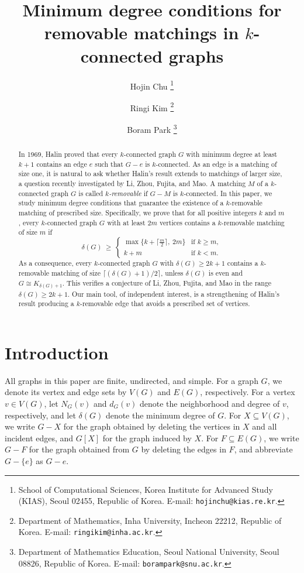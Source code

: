 \documentclass[11pt]{article}
\title{Minimum degree conditions for removable matchings in $k$-connected graphs}
\author{Hojin Chu
\thanks{School of Computational Sciences, Korea Institute for Advanced Study (KIAS), Seoul 02455, Republic of Korea. E-mail: {\tt hojinchu@kias.re.kr}.}
\and Ringi Kim
\thanks{Department of Mathematics, Inha University, Incheon 22212, Republic of Korea. E-mail: {\tt ringikim@inha.ac.kr}.}
\and Boram Park
\thanks{Department of Mathematics Education, Seoul National University, Seoul 08826, Republic of Korea. E-mail: {\tt borampark@snu.ac.kr}.}
}
\date{}
\numberwithin{equation}{section}
\begin{document}
\maketitle

\begin{abstract}
In 1969, Halin proved that every $k$-connected graph $G$ with minimum degree at least $k+1$ contains an edge $e$ such that $G-e$ is $k$-connected. As an edge is a matching of size one, it is natural to ask whether Halin's result extends to matchings of larger size, a question recently investigated by Li, Zhou, Fujita, and Mao. A matching $M$ of a $k$-connected graph $G$ is called \emph{$k$-removable} if $G-M$ is $k$-connected.  In this paper, we study minimum degree conditions that guarantee the existence of a $k$-removable matching of prescribed size. Specifically, we prove that for all positive integers $k$ and $m$, every $k$-connected graph $G$ with at least $2m$ vertices contains a $k$-removable matching of size $m$ if  \[\delta(G)\ \ge\ \begin{cases} \max\bigl\{k+\bigl\lceil\tfrac m2\bigr\rceil,\ 2m\bigr\} & \text{if } k\ge m,\\[2pt] k+m & \text{if } k<m. \end{cases}\] As a consequence, every $k$-connected graph $G$ with $\delta(G)\ge2k+1$ contains a $k$-removable matching of size $\bigl\lceil(\delta(G)+1)/2\bigr\rceil$, unless $\delta(G)$ is even and $G\cong K_{\delta(G)+1}$.  This verifies a conjecture of Li, Zhou, Fujita, and Mao in the range $\delta(G)\ge2k+1$. Our main tool, of independent interest, is a strengthening of Halin's result producing a $k$-removable edge that avoids a prescribed set of vertices.
\end{abstract}

\section{Introduction}

All graphs in this paper are finite, undirected, and simple. For a graph $G$, we denote its vertex and edge sets by $V(G)$ and $E(G)$, respectively. For a vertex $v\in V(G)$, let $N_G(v)$ and $d_G(v)$ denote the neighborhood and degree of $v$, respectively, and let $\delta(G)$ denote the minimum degree of $G$. For $X\subseteq V(G)$, we write $G-X$ for the graph obtained by deleting the vertices in $X$ and all incident edges, and $G[X]$ for the graph induced by $X$. For $F\subseteq E(G)$, we write $G-F$ for the graph obtained from $G$ by deleting the edges in $F$, and abbreviate $G-\{e\}$ as $G-e$.
\end{document}

